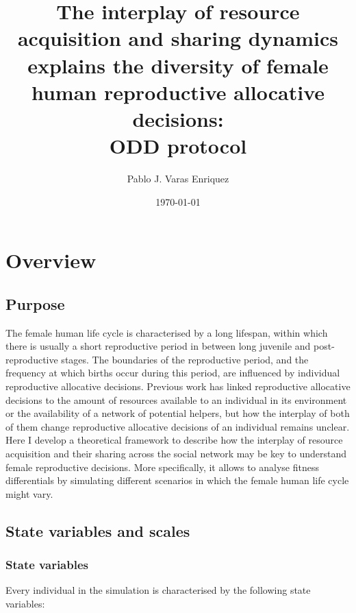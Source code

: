 \documentclass{article}
\title{The interplay of resource acquisition and sharing dynamics explains the diversity of female human reproductive allocative decisions:
\\
ODD protocol}
\author{Pablo J. Varas Enriquez}
\date{\today}
\begin{document}
\maketitle

\tableofcontents

\section{Overview}

\subsection{Purpose}

The female human life cycle is characterised by a long lifespan, within which there is usually a short reproductive period in between long juvenile and post-reproductive stages. The boundaries of the reproductive period, and the frequency at which births occur during this period, are influenced by individual reproductive allocative decisions. Previous work has linked reproductive allocative decisions to the amount of resources available to an individual in its environment or the availability of a network of potential helpers, but how the interplay of both of them change reproductive allocative decisions of an individual remains unclear. Here I develop a theoretical framework to describe how the interplay of resource acquisition and their sharing across the social network may be key to understand female reproductive decisions. More specifically, it allows to analyse fitness differentials by simulating different scenarios in which the female human life cycle might vary.

\subsection{State variables and scales}

\subsubsection{State variables}

Every individual in the simulation is characterised by the following state variables:
\end{document}
